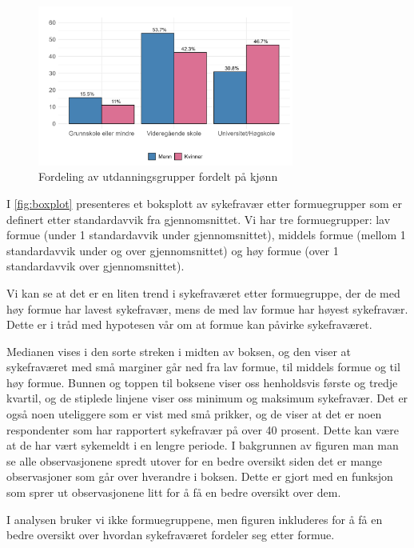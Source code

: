 \documentclass[
  12pt,
  a4paper,
  DIV=11,
  numbers=noendperiod]{scrartcl}
\begin{document}
\vspace{-0.5cm}
\begin{figure}[H]
\caption{Fordeling av utdanningsgrupper fordelt på kjønn}
\label{fig:barplot_2}
\centering
\includegraphics[width=0.75\textwidth]{dokumentobjekter/figurer/fig_5.png}
\end{figure}
\vspace{-1cm}

I \autoref{fig:boxplot} presenteres et boksplott av sykefravær etter
formuegrupper som er definert etter standardavvik fra gjennomsnittet. Vi
har tre formuegrupper: lav formue (under 1 standardavvik under
gjennomsnittet), middels formue (mellom 1 standardavvik under og over
gjennomsnittet) og høy formue (over 1 standardavvik over
gjennomsnittet).

Vi kan se at det er en liten trend i sykefraværet etter formuegruppe,
der de med høy formue har lavest sykefravær, mens de med lav formue har
høyest sykefravær. Dette er i tråd med hypotesen vår om at formue kan
påvirke sykefraværet.

Medianen vises i den sorte streken i midten av boksen, og den viser at
sykefraværet med små marginer går ned fra lav formue, til middels formue
og til høy formue. Bunnen og toppen til boksene viser oss henholdsvis
første og tredje kvartil, og de stiplede linjene viser oss minimum og
maksimum sykefravær. Det er også noen uteliggere som er vist med små
prikker, og de viser at det er noen respondenter som har rapportert
sykefravær på over 40 prosent. Dette kan være at de har vært sykemeldt i
en lengre periode. I bakgrunnen av figuren man man se alle
observasjonene spredt utover for en bedre oversikt siden det er mange
observasjoner som går over hverandre i boksen. Dette er gjort med en
funksjon som sprer ut observasjonene litt for å få en bedre oversikt
over dem.

I analysen bruker vi ikke formuegruppene, men figuren inkluderes for å
få en bedre oversikt over hvordan sykefraværet fordeler seg etter
formue.
\end{document}
